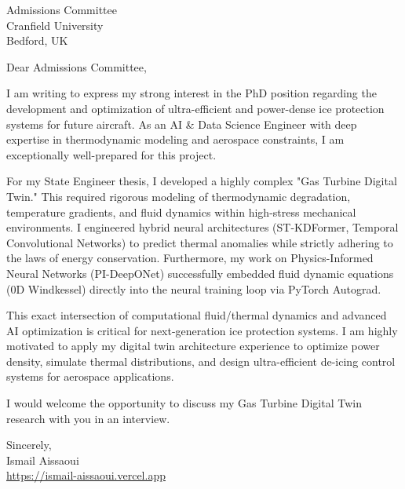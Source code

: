 \documentclass[11pt, a4paper]{letter}
\begin{document}
\begin{letter}{Admissions Committee \\ Cranfield University \\ Bedford, UK}
\opening{Dear Admissions Committee,}

I am writing to express my strong interest in the PhD position regarding the development and optimization of ultra-efficient and power-dense ice protection systems for future aircraft. As an AI \& Data Science Engineer with deep expertise in thermodynamic modeling and aerospace constraints, I am exceptionally well-prepared for this project.

For my State Engineer thesis, I developed a highly complex "Gas Turbine Digital Twin." This required rigorous modeling of thermodynamic degradation, temperature gradients, and fluid dynamics within high-stress mechanical environments. I engineered hybrid neural architectures (ST-KDFormer, Temporal Convolutional Networks) to predict thermal anomalies while strictly adhering to the laws of energy conservation. Furthermore, my work on Physics-Informed Neural Networks (PI-DeepONet) successfully embedded fluid dynamic equations (0D Windkessel) directly into the neural training loop via PyTorch Autograd.

This exact intersection of computational fluid/thermal dynamics and advanced AI optimization is critical for next-generation ice protection systems. I am highly motivated to apply my digital twin architecture experience to optimize power density, simulate thermal distributions, and design ultra-efficient de-icing control systems for aerospace applications.

I would welcome the opportunity to discuss my Gas Turbine Digital Twin research with you in an interview.

\closing{Sincerely, \\ Ismail Aissaoui \\ \href{https://ismail-aissaoui.vercel.app}{https://ismail-aissaoui.vercel.app}}
\end{letter}
\end{document}

